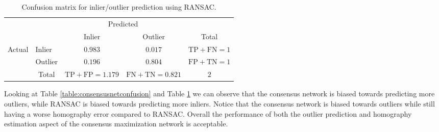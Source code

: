 \begin{table}[H]
	\centering
	\begin{tabular}{l|l|c|c|c}
		\multicolumn{2}{c}{}&\multicolumn{2}{c}{Predicted}&\\
		\cline{3-4}
		\multicolumn{2}{c|}{}&Inlier&Outlier&\multicolumn{1}{c}{Total}\\
		\cline{2-4}
		\multirow{2}{*}{Actual}& Inlier & $0.983$ & $0.017$ & $\mathrm{TP}+\mathrm{FN}=1$\\
		\cline{2-4}
		& Outlier & $0.196$ & $0.804$ & $\mathrm{FP}+\mathrm{TN}=1$\\
		\cline{2-4}
		\multicolumn{1}{c}{} & \multicolumn{1}{c}{Total} & \multicolumn{1}{c}{$\mathrm{TP}+\mathrm{FP}=1.179$} & \multicolumn{    1}{c}{$\mathrm{FN}+\mathrm{TN}=0.821$} & \multicolumn{1}{c}{$2$}\\
	\end{tabular}
	\caption{Confusion matrix for inlier/outlier prediction using RANSAC.}
	\label{table:ransacconfusion}
\end{table}

Looking at Table \ref{table:consensusnetconfusion} and Table \ref{table:ransacconfusion} we can observe that the consensus network is biased towards predicting more outliers, while RANSAC is biased towards predicting more inliers. Notice that the consensus network is biased towards outliers while still having a worse homography error compared to RANSAC. Overall the performance of both the outlier prediction and homography estimation aspect of the consensus maximization network is acceptable.


